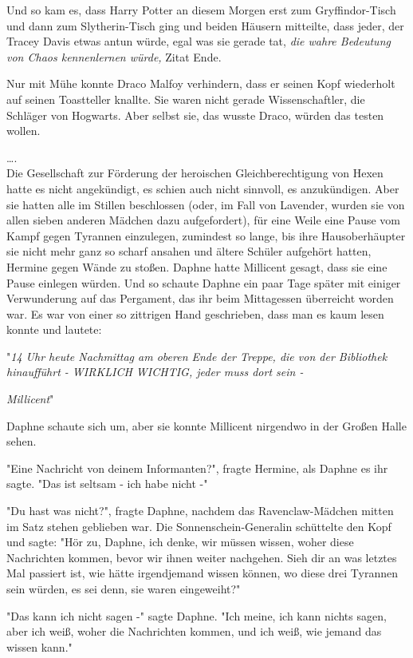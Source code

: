 {Und so kam es, dass Harry Potter an diesem Morgen erst zum Gryffindor-Tisch und dann zum Slytherin-Tisch ging und beiden Häusern mitteilte, dass jeder, der Tracey Davis etwas antun würde, egal was sie gerade tat, \emph{die wahre Bedeutung von Chaos kennenlernen würde,} Zitat Ende.

Nur mit Mühe konnte Draco Malfoy verhindern, dass er seinen Kopf wiederholt auf seinen Toastteller knallte. Sie waren nicht gerade Wissenschaftler, die Schläger von Hogwarts. Aber selbst sie, das wusste Draco, würden das testen wollen.

….\\ Die Gesellschaft zur Förderung der heroischen Gleichberechtigung von Hexen hatte es nicht angekündigt, es schien auch nicht sinnvoll, es anzukündigen. Aber sie hatten alle im Stillen beschlossen (oder, im Fall von Lavender, wurden sie von allen sieben anderen Mädchen dazu aufgefordert), für eine Weile eine Pause vom Kampf gegen Tyrannen einzulegen, zumindest so lange, bis ihre Hausoberhäupter sie nicht mehr ganz so scharf ansahen und ältere Schüler aufgehört hatten, Hermine gegen Wände zu stoßen. Daphne hatte Millicent gesagt, dass sie eine Pause einlegen würden. Und so schaute Daphne ein paar Tage später mit einiger Verwunderung auf das Pergament, das ihr beim Mittagessen überreicht worden war. Es war von einer so zittrigen Hand geschrieben, dass man es kaum lesen konnte und lautete:

"\emph{14 Uhr heute Nachmittag am oberen Ende der Treppe, die von der Bibliothek hinaufführt - WIRKLICH WICHTIG, jeder muss dort sein -}

\emph{Millicent}"

Daphne schaute sich um, aber sie konnte Millicent nirgendwo in der Großen Halle sehen.

"Eine Nachricht von deinem Informanten?", fragte Hermine, als Daphne es ihr sagte. "Das ist seltsam - ich habe nicht -"

"Du hast was nicht?", fragte Daphne, nachdem das Ravenclaw-Mädchen mitten im Satz stehen geblieben war. Die Sonnenschein-Generalin schüttelte den Kopf und sagte: "Hör zu, Daphne, ich denke, wir müssen wissen, woher diese Nachrichten kommen, bevor wir ihnen weiter nachgehen. Sieh dir an was letztes Mal passiert ist, wie hätte irgendjemand wissen können, wo diese drei Tyrannen sein würden, es sei denn, sie waren eingeweiht?"

"Das kann ich nicht sagen -" sagte Daphne. "Ich meine, ich kann nichts sagen, aber ich weiß, woher die Nachrichten kommen, und ich weiß, wie jemand das wissen kann."

}
